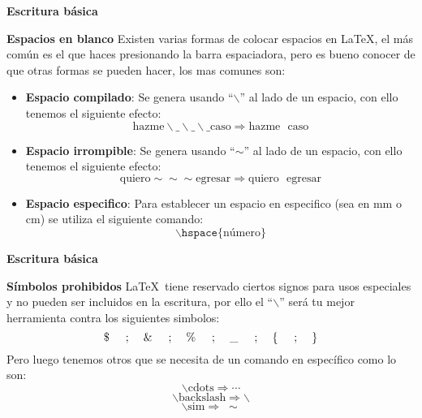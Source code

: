\documentclass[aspectratio=169]{beamer}
\begin{document}
\begin{frame}[plain]


    
\end{frame}


\begin{frame}{\bf Escritura básica}
\begin{alertblock}{\bf Espacios en blanco}
Existen varias formas de colocar espacios en \LaTeX, el más común es el que haces presionando la barra espaciadora, pero es bueno conocer de que otras formas se pueden hacer, los mas comunes son:\begin{itemize}
\item \textbf{Espacio compilado}: Se genera usando ``$\backslash$'' al lado de un espacio, con ello tenemos el siguiente efecto:
$$\text{hazme}\backslash\_\backslash\_\backslash\_\text{caso}\Rightarrow\text{hazme}\ \ \ \text{caso}$$
\item \textbf{Espacio irrompible}: Se genera usando ``$\mathtt{\sim}$'' al lado de un espacio, con ello tenemos el siguiente efecto:
$$\text{quiero}\mathtt{\sim}\mathtt{\sim}\mathtt{\sim}\text{egresar}\Rightarrow\text{quiero}~~~\text{egresar}$$
\item \textbf{Espacio especifico}: Para establecer un espacio en especifico (sea en mm o cm) se utiliza el siguiente comando:
$$\backslash\texttt{hspace}\{\text{número}\}$$
\end{itemize}
\end{alertblock}
\end{frame}

\begin{frame}{\bf Escritura básica}
\begin{alertblock}{\bf Símbolos prohibidos}
\LaTeX\ tiene reservado ciertos signos para usos especiales y no pueden ser incluidos en la escritura, por ello el ``$\backslash$'' será tu mejor herramienta contra los siguientes simbolos:
$$\$\hspace{5mm};\hspace{4mm}\&\hspace{5mm};\hspace{4mm}\%\hspace{5mm};\hspace{4mm}\_\hspace{5mm};\hspace{4mm}\{\hspace{5mm};\hspace{4mm} \}$$
Pero luego tenemos otros que se necesita de un comando en específico como lo son:
$$\backslash\text{cdots}\Rightarrow \cdots$$
$$\backslash\text{backslash}\Rightarrow \backslash$$
$$\backslash\text{sim}\Rightarrow\;\sim$$
\end{alertblock}
\end{frame}
\end{document}
